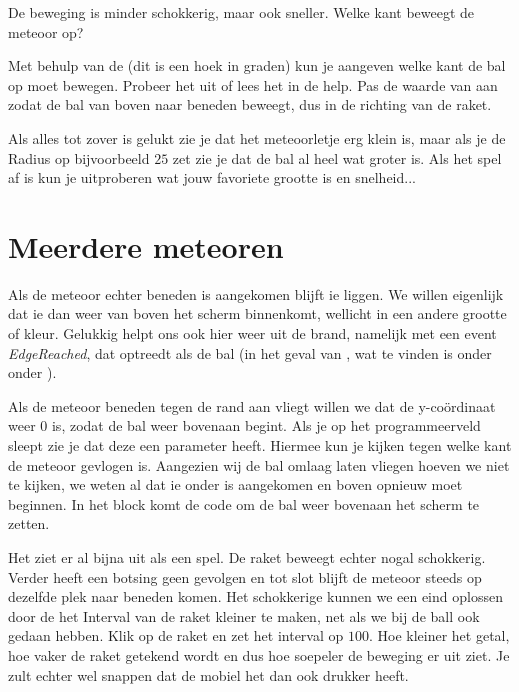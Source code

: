 De beweging is minder schokkerig, maar ook sneller. Welke kant beweegt de meteoor op? 

\begin{opgave}
   \opgVraag
	Met behulp van de  (dit is een hoek in graden) kun je aangeven welke kant de bal op moet bewegen. Probeer het uit of lees het in de help. 
	Pas de waarde van  aan zodat de bal van boven naar beneden beweegt, dus in de richting van de raket. 
\end{opgave}

Als alles tot zover is gelukt zie je dat het meteoorletje erg klein is, maar als je de Radius op bijvoorbeeld $25$ zet zie je dat de bal al heel wat groter is. Als het spel af is kun je uitproberen wat jouw favoriete grootte is en snelheid... 


\section{Meerdere meteoren}
Als de meteoor echter beneden is aangekomen blijft ie liggen. We willen eigenlijk dat ie dan weer van boven het scherm binnenkomt,  wellicht in een andere grootte of kleur. Gelukkig helpt \ai ons ook hier weer uit de brand, namelijk met een event \emph{EdgeReached}, dat optreedt als de bal (in het geval van , wat te vinden is onder  onder ). 

Als de meteoor beneden tegen de rand aan vliegt willen we dat de y-co\"ordinaat weer $0$ is, zodat de bal weer bovenaan begint. 
Als je  op het programmeerveld sleept zie je dat deze een parameter  heeft. Hiermee kun je kijken tegen welke kant de meteoor gevlogen is. Aangezien wij de bal omlaag laten vliegen hoeven we niet te kijken, we weten al dat ie onder is aangekomen en boven opnieuw moet beginnen. In het block komt de code om de bal weer bovenaan het scherm te zetten. 


\runOpTelefoon{}
Het ziet er al bijna uit als een spel. De raket beweegt echter nogal schokkerig. Verder heeft een botsing geen gevolgen en tot slot blijft de meteoor steeds op dezelfde plek naar beneden komen. Het schokkerige kunnen we een eind oplossen door de het Interval van de raket kleiner te maken, net als we bij de ball ook gedaan hebben. Klik op de raket en zet het interval op $100$. Hoe kleiner het getal, hoe vaker de raket getekend wordt en dus hoe soepeler de beweging er uit ziet. Je zult echter wel snappen dat de mobiel het dan ook drukker heeft. 

